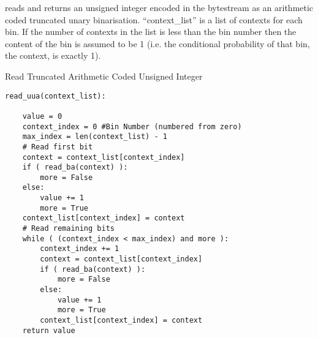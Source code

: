 \begin{comment}
This section specifies the operation of the unsigned truncated unary
arithmetic decoding function ut\_arith\_decode() in terms of binary
arithmetic coding operations.

Pseudo-code for ut\_arith\_decode() is as follows, for values known to be
in the range :

\begin{verbatim}
VALUE=0

while ( !binary\_arith\_decode( choose\_context() ) && VALUE<N )

    VALUE++
\end{verbatim}

choose\_context() is a function that produces a context with which the
binary bit shall be decoded. The value it returns can depend on any
values known to the decoder at the time it is called, especially
including the binarisation bin (the bin number is equal to VALUE+1
according to the conventions of Appendix ).

\end{comment}


reads and returns an unsigned integer encoded in the bytestream as an
arithmetic coded truncated unary binarisation. ``context\_list'' is a list
of contexts for each bin. If the number of contexts in the list is less
than the bin number then the content of the bin is assumed to be 1 (i.e.
the conditional probability of that bin, the context, is exactly 1).

Read Truncated Arithmetic Coded Unsigned Integer
\begin{verbatim}
read_uua(context_list):

    value = 0
    context_index = 0 #Bin Number (numbered from zero)
    max_index = len(context_list) - 1
    # Read first bit
    context = context_list[context_index]
    if ( read_ba(context) ):
        more = False
    else:
        value += 1
        more = True
    context_list[context_index] = context
    # Read remaining bits
    while ( (context_index < max_index) and more ):
        context_index += 1
        context = context_list[context_index]
        if ( read_ba(context) ):
            more = False
        else:
            value += 1
            more = True
        context_list[context_index] = context
    return value
\end{verbatim}
